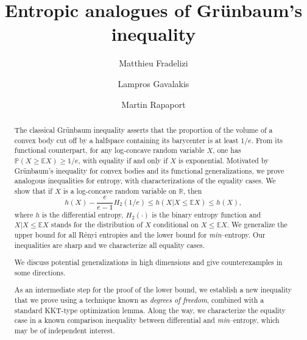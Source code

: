 \documentclass{article}
\title{Entropic analogues of Gr{\"u}nbaum's inequality}
\date{}
\author[1]{Matthieu Fradelizi}
\author[2]{Lampros Gavalakis}
\author[3]{Martin Rapaport}
\affil[1]{Univ Gustave Eiffel
                      }
\affil[2]{University of Cambridge 
}
\affil[3]{
Carnegie Mellon University
                }
\theoremstyle{plain}
\theoremstyle{definition}
\newcommand{\1}{\mathbf 1}
\begin{document}
\maketitle
 
\begin{abstract} 
The classical Gr{\"u}nbaum inequality asserts that the proportion of the volume of a convex body cut off by a halfspace containing its barycenter is at least $1/e$. From its functional counterpart, for any log-concave random variable $X$, one has $\mathbb{P}(X\ge \mathbb{E}X)\ge 1/e$, with equality if and only if $X$ is exponential. 
Motivated by Gr{\"u}nbaum's inequality for convex bodies and its functional generalizations, we prove analogous inequalities for entropy, with characterizations of the equality cases. We show that if $X$ is a log-concave random variable on $\mathbb{R}$, then
$$
        h(X)-\frac{e}{e-1}H_2(1/e) \leq h(X|X \leq \mathbb{E}X) \leq h(X),
$$
where $h$ is the differential entropy, $H_2(\cdot)$ is the binary entropy function and $X|X\leq \mathbb{E}X$ stands for the distribution of $X$ conditional on $X\leq \mathbb{E}X$. We generalize the upper bound for all R{\'e}nyi entropies and the lower bound for {\em min}--entropy. Our inequalities are sharp and we characterize all equality cases. 

We discuss potential generalizations in high dimensions and give counterexamples in some directions. 

As an intermediate step for the proof of the lower bound, we establish a new inequality that we prove using a technique known as \textit{degrees of freedom}, combined with a standard KKT-type optimization lemma. Along the way, we characterize the equality case in a known comparison inequality between differential and {\em min}--entropy, which may be of independent interest.  
\end{abstract}
\end{document}
